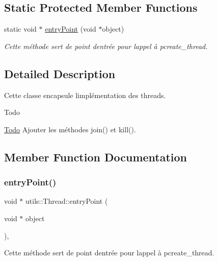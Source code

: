 \subsection*{Static Protected Member Functions}
\begin{DoxyCompactItemize}
\item 
static void $\ast$ \hyperlink{classutils_1_1Thread_a61b6c3d0b87570254646120b323b89f7}{entry\+Point} (void $\ast$object)
\begin{DoxyCompactList}\small\item\em Cette méthode sert de point d\textquotesingle{}entrée pour l\textquotesingle{}appel à pcreate\+\_\+thread. \end{DoxyCompactList}\end{DoxyCompactItemize}


\subsection{Detailed Description}
Cette classe encapsule l\textquotesingle{}implémentation des threads. 

\begin{DoxyRefDesc}{Todo}
\item[\hyperlink{todo__todo000006}{Todo}]Ajouter les méthodes join() et kill(). \end{DoxyRefDesc}


\subsection{Member Function Documentation}
\mbox{\label{classutils_1_1Thread_a61b6c3d0b87570254646120b323b89f7}} 
\subsubsection{\texorpdfstring{entry\+Point()}{entryPoint()}}
{\footnotesize\ttfamily void $\ast$ utils\+::\+Thread\+::entry\+Point (\begin{DoxyParamCaption}\item[{void $\ast$}]{object }\end{DoxyParamCaption})\hspace{0.3cm}{\ttfamily [static]}, {\ttfamily [protected]}}



Cette méthode sert de point d\textquotesingle{}entrée pour l\textquotesingle{}appel à pcreate\+\_\+thread. 


